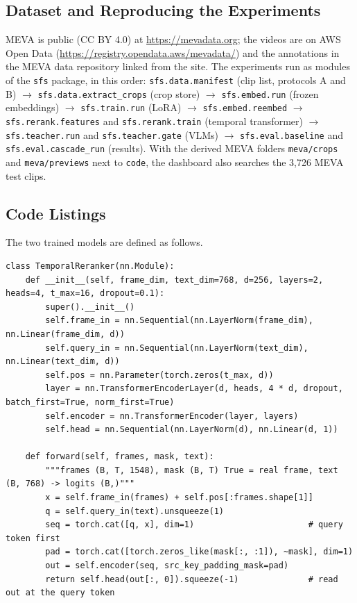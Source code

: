 \documentclass[11pt,a4paper]{article}
\begin{document}
\subsection{Dataset and Reproducing the Experiments}\label{app:repro}
MEVA is public (CC BY 4.0) at \url{https://mevadata.org}; the videos are on AWS Open Data
(\url{https://registry.opendata.aws/mevadata/}) and the annotations in the MEVA data repository linked from the
site. The experiments run as modules of the \texttt{sfs} package, in this order:
\texttt{sfs.data.manifest} (clip list, protocols A and B) $\rightarrow$ \texttt{sfs.data.extract\_crops} (crop
store) $\rightarrow$ \texttt{sfs.embed.run} (frozen embeddings) $\rightarrow$ \texttt{sfs.train.run} (LoRA)
$\rightarrow$ \texttt{sfs.embed.reembed} $\rightarrow$ \texttt{sfs.rerank.features} and \texttt{sfs.rerank.train}
(temporal transformer) $\rightarrow$ \texttt{sfs.teacher.run} and \texttt{sfs.teacher.gate} (VLMs)
$\rightarrow$ \texttt{sfs.eval.baseline} and \texttt{sfs.eval.cascade\_run} (results). With the derived MEVA
folders \texttt{meva/crops} and \texttt{meva/previews} next to \texttt{code}, the dashboard also searches the
3,726 MEVA test clips.

\subsection{Code Listings}
The two trained models are defined as follows.

\begin{lstlisting}[caption={Temporal transformer (re-ranker), \texttt{sfs/rerank/model.py}.}]
class TemporalReranker(nn.Module):
    def __init__(self, frame_dim, text_dim=768, d=256, layers=2, heads=4, t_max=16, dropout=0.1):
        super().__init__()
        self.frame_in = nn.Sequential(nn.LayerNorm(frame_dim), nn.Linear(frame_dim, d))
        self.query_in = nn.Sequential(nn.LayerNorm(text_dim), nn.Linear(text_dim, d))
        self.pos = nn.Parameter(torch.zeros(t_max, d))
        layer = nn.TransformerEncoderLayer(d, heads, 4 * d, dropout, batch_first=True, norm_first=True)
        self.encoder = nn.TransformerEncoder(layer, layers)
        self.head = nn.Sequential(nn.LayerNorm(d), nn.Linear(d, 1))

    def forward(self, frames, mask, text):
        """frames (B, T, 1548), mask (B, T) True = real frame, text (B, 768) -> logits (B,)"""
        x = self.frame_in(frames) + self.pos[:frames.shape[1]]
        q = self.query_in(text).unsqueeze(1)
        seq = torch.cat([q, x], dim=1)                       # query token first
        pad = torch.cat([torch.zeros_like(mask[:, :1]), ~mask], dim=1)
        out = self.encoder(seq, src_key_padding_mask=pad)
        return self.head(out[:, 0]).squeeze(-1)              # read out at the query token
\end{lstlisting}
\end{document}
